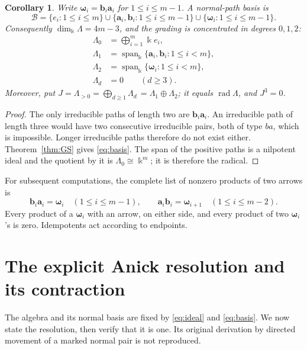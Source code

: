 \documentclass[a4paper,11pt,oneside,reqno]{amsart}
\newtheorem{corollary}[theorem]{Corollary}
\theoremstyle{definition}
\numberwithin{equation}{section}
\begin{document}
	\begin{corollary}\label{cor:basis}
		Write $\boldsymbol{\omega}_i=\mathbf{b}_i\mathbf{a}_i$ for $1\leq i\leq m-1$.  A normal-path basis is
		\begin{equation}\label{eq:basis}
			\mathcal B=
			\{e_i:1\leq i\leq m\}
			\cup\{\mathbf{a}_i,\mathbf{b}_i:1\leq i\leq m-1\}
			\cup\{\boldsymbol{\omega}_i:1\leq i\leq m-1\}.
		\end{equation}
		Consequently $\dim_{\Bbbk}\Lambda=4m-3$, and the grading is
		concentrated in degrees $0,1,2$:
		\[
		\begin{aligned}
			\Lambda_0&=\bigoplus_{i=1}^m\Bbbk e_i,\\
			\Lambda_1&=\operatorname{span}_{\Bbbk}\{\mathbf{a}_i,\mathbf{b}_i:1\leq i<m\},\\
			\Lambda_2&=\operatorname{span}_{\Bbbk}\{\boldsymbol{\omega}_i:1\leq i<m\},\\
			\Lambda_d&=0\qquad(d\geq3).
		\end{aligned}
		\]
		Moreover, put $J=\Lambda_{>0}=\bigoplus_{d\ge1}\Lambda_d\,=\Lambda_1\oplus\Lambda_2$; it
		equals $\operatorname{rad}\Lambda$, and $J^3=0$.
	\end{corollary}
	
	\begin{proof}
		The only irreducible paths of length two are $\mathbf{b}_i\mathbf{a}_i$.  An irreducible
		path of length three would have two consecutive irreducible pairs, both
		of type $ba$, which is impossible.  Longer irreducible paths therefore do
		not exist either.  Theorem~\ref{thm:GS} gives \eqref{eq:basis}.
		The span of the positive paths is a nilpotent ideal and the quotient by it
		is $\Lambda_0\cong\Bbbk^m$; it is therefore the radical.
	\end{proof}
	
	For subsequent computations, the complete list of nonzero products of
	two arrows is
	\begin{equation}\label{eq:arrow-products}
		\mathbf{b}_i\mathbf{a}_i=\boldsymbol{\omega}_i\quad(1\leq i\leq m-1),\qquad
		\mathbf{a}_i\mathbf{b}_i=\boldsymbol{\omega}_{i+1}\quad(1\leq i\leq m-2).
	\end{equation}
	Every product of a $\boldsymbol{\omega}_i$ with an arrow, on either side, and every product
	of two $\boldsymbol{\omega}_i$'s is zero.  Idempotents act according to endpoints.
	
	
\section{The explicit Anick resolution and its contraction}\label{sec:differential}
The algebra and its normal basis are fixed by \eqref{eq:ideal} and
\eqref{eq:basis}. We now state the resolution, then verify that it is
one. Its original derivation by directed movement of a marked normal
pair is not reproduced.
\end{document}
